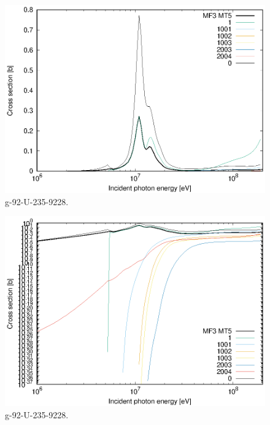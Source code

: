 \begin{figure}
 \includegraphics[width=\linewidth]{eps/g_92-U-235_9228.eps}
  \caption{g-92-U-235-9228.}
\end{figure}
\begin{figure}
 \includegraphics[width=\linewidth]{eps-log/g_92-U-235_9228.eps}
 \caption{g-92-U-235-9228.}
\end{figure}
\newpage \clearpage

